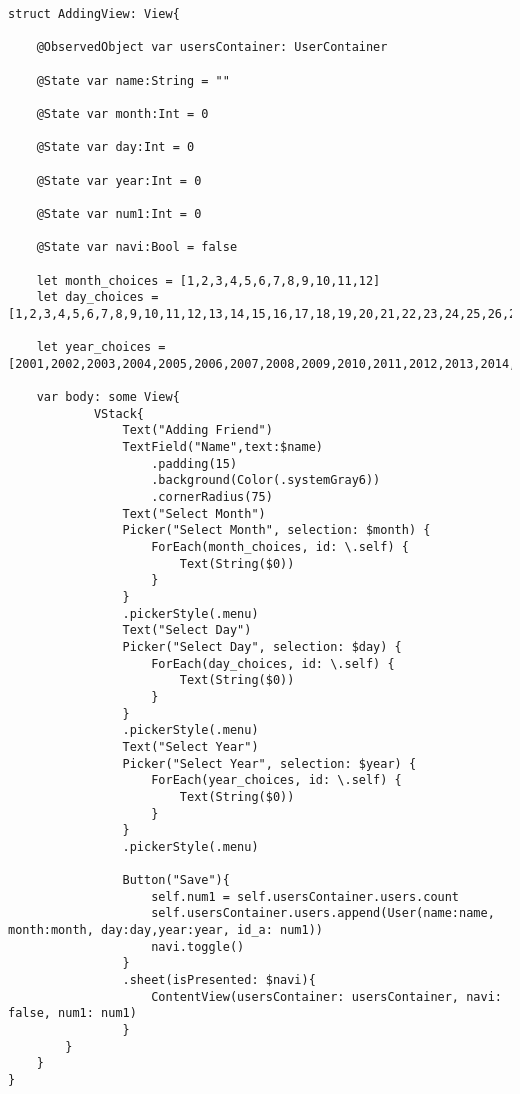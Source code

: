 \documentclass{article}
\theoremstyle{theorem}
\theoremstyle{definition}
\theoremstyle{remark}
\begin{document}
\begin{verbatim}
struct AddingView: View{
    
    @ObservedObject var usersContainer: UserContainer
    
    @State var name:String = ""
    
    @State var month:Int = 0
    
    @State var day:Int = 0
    
    @State var year:Int = 0
    
    @State var num1:Int = 0
    
    @State var navi:Bool = false
    
    let month_choices = [1,2,3,4,5,6,7,8,9,10,11,12]
    let day_choices = [1,2,3,4,5,6,7,8,9,10,11,12,13,14,15,16,17,18,19,20,21,22,23,24,25,26,27,28,29,30,31]
    
    let year_choices = [2001,2002,2003,2004,2005,2006,2007,2008,2009,2010,2011,2012,2013,2014,2015,2016,2017,2018,2019,2020,2021,2022]
    
    var body: some View{
            VStack{
                Text("Adding Friend")
                TextField("Name",text:$name)
                    .padding(15)
                    .background(Color(.systemGray6))
                    .cornerRadius(75)
                Text("Select Month")
                Picker("Select Month", selection: $month) {
                    ForEach(month_choices, id: \.self) {
                        Text(String($0))
                    }
                }
                .pickerStyle(.menu)
                Text("Select Day")
                Picker("Select Day", selection: $day) {
                    ForEach(day_choices, id: \.self) {
                        Text(String($0))
                    }
                }
                .pickerStyle(.menu)
                Text("Select Year")
                Picker("Select Year", selection: $year) {
                    ForEach(year_choices, id: \.self) {
                        Text(String($0))
                    }
                }
                .pickerStyle(.menu)
                
                Button("Save"){
                    self.num1 = self.usersContainer.users.count
                    self.usersContainer.users.append(User(name:name, month:month, day:day,year:year, id_a: num1))
                    navi.toggle()
                }
                .sheet(isPresented: $navi){
                    ContentView(usersContainer: usersContainer, navi: false, num1: num1)
                }
        }
    }
}
\end{verbatim}
\end{document}
